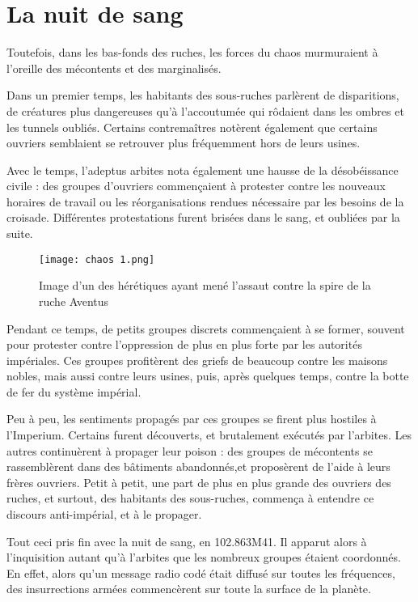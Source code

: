 \documentclass[10pt,a4paper]{book}
\begin{document}
\section{La nuit de sang}
Toutefois, dans les bas-fonds des ruches, les forces du chaos murmuraient à l'oreille des mécontents et des marginalisés. 

Dans un premier temps, les habitants des sous-ruches parlèrent de disparitions, de créatures plus dangereuses qu'à l'accoutumée qui rôdaient dans les ombres et les tunnels oubliés. Certains contremaîtres notèrent également que certains ouvriers semblaient se retrouver plus fréquemment hors de leurs usines.

Avec le temps, l'adeptus arbites nota également une hausse de la désobéissance civile : des groupes d'ouvriers commençaient à protester contre les nouveaux horaires de travail ou les réorganisations rendues nécessaire par les besoins de la croisade. Différentes protestations furent brisées dans le sang, et oubliées par la suite.

\begin{wrapfigure}{r}{0.3\textwidth}
  \centering
  \texttt{[image: chaos 1.png]}
  \caption{Image d'un des hérétiques ayant mené l'assaut contre la spire de la ruche Aventus}
\end{wrapfigure}

Pendant ce temps, de petits groupes discrets commençaient à se former, souvent pour protester contre l'oppression de plus en plus forte par les autorités impériales. Ces groupes profitèrent des griefs de beaucoup contre les maisons nobles, mais aussi contre leurs usines, puis, après quelques temps, contre la botte de fer du système impérial.

Peu à peu, les sentiments propagés par ces groupes se firent plus hostiles à l'Imperium. Certains furent découverts, et brutalement exécutés par l'arbites. Les autres continuèrent à propager leur poison : des groupes de mécontents se rassemblèrent dans des bâtiments abandonnés,et proposèrent de l'aide à leurs frères ouvriers. Petit à petit, une part de plus en plus grande des ouvriers des ruches, et surtout, des habitants des sous-ruches, commença à entendre ce discours anti-impérial, et à le propager.

Tout ceci pris fin avec la nuit de sang, en 102.863M41. Il apparut alors à l'inquisition autant qu'à l'arbites que les nombreux groupes étaient coordonnés. En effet, alors qu'un message radio codé était diffusé sur toutes les fréquences, des insurrections armées commencèrent sur toute la surface de la planète.
\end{document}
